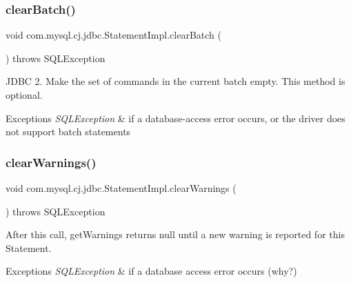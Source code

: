 \subsubsection{\texorpdfstring{clear\+Batch()}{clearBatch()}}
{\footnotesize\ttfamily void com.\+mysql.\+cj.\+jdbc.\+Statement\+Impl.\+clear\+Batch (\begin{DoxyParamCaption}{ }\end{DoxyParamCaption}) throws S\+Q\+L\+Exception}

J\+D\+BC 2. Make the set of commands in the current batch empty. This method is optional.


\begin{DoxyExceptions}{Exceptions}
{\em S\+Q\+L\+Exception} & if a database-\/access error occurs, or the driver does not support batch statements \\
\hline
\end{DoxyExceptions}
\mbox{\label{classcom_1_1mysql_1_1cj_1_1jdbc_1_1_statement_impl_a7356ed117aa4417ec6ce92292f53470b}} 
\subsubsection{\texorpdfstring{clear\+Warnings()}{clearWarnings()}}
{\footnotesize\ttfamily void com.\+mysql.\+cj.\+jdbc.\+Statement\+Impl.\+clear\+Warnings (\begin{DoxyParamCaption}{ }\end{DoxyParamCaption}) throws S\+Q\+L\+Exception}

After this call, get\+Warnings returns null until a new warning is reported for this Statement.


\begin{DoxyExceptions}{Exceptions}
{\em S\+Q\+L\+Exception} & if a database access error occurs (why?) \\
\hline
\end{DoxyExceptions}
\mbox{\label{classcom_1_1mysql_1_1cj_1_1jdbc_1_1_statement_impl_ac913294cd1adc42af73229a6ba2e4f0b}} 
